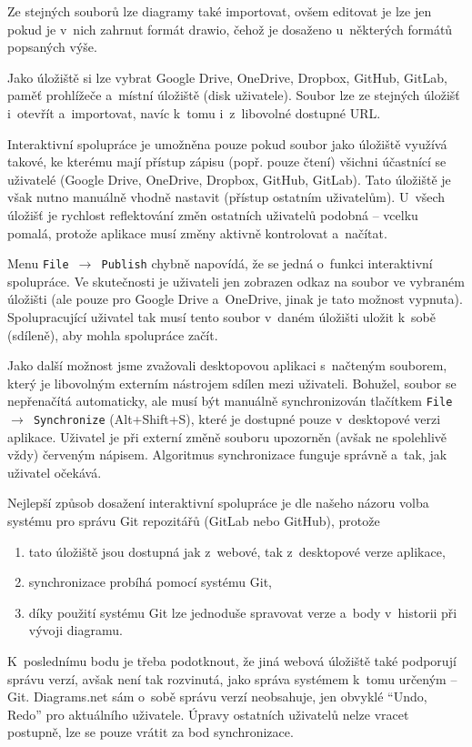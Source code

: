 Ze stejných souborů lze diagramy také importovat, ovšem editovat je lze jen
pokud je v~nich zahrnut formát drawio, čehož je dosaženo u~některých formátů
popsaných výše.

Jako úložiště si lze vybrat Google Drive, OneDrive, Dropbox, GitHub, GitLab,
paměť prohlížeče a~místní úložiště (disk uživatele). Soubor lze ze stejných
úložišť i~otevřít a~importovat, navíc k~tomu i~z~libovolné dostupné URL.

Interaktivní spolupráce je umožněna pouze pokud soubor jako úložiště využívá
takové, ke kterému mají přístup zápisu (popř. pouze čtení) všichni účastnící se
uživatelé (Google Drive, OneDrive, Dropbox, GitHub, GitLab). Tato úložiště je
však nutno manuálně vhodně nastavit (přístup ostatním uživatelům). U~všech
úložišť je rychlost reflektování změn ostatních uživatelů podobná -- vcelku
pomalá, protože aplikace musí změny aktivně kontrolovat a~načítat.

Menu \texttt{File $\rightarrow$ Publish} chybně napovídá, že se jedná o~funkci interaktivní
spolupráce. Ve skutečnosti je uživateli jen zobrazen odkaz na soubor ve vybraném
úložišti (ale pouze pro Google Drive a~OneDrive, jinak je tato možnost vypnuta).
Spolupracující uživatel tak musí tento soubor v~daném úložišti uložit k~sobě
(sdíleně), aby mohla spolupráce začít. 

Jako další možnost jsme zvažovali desktopovou aplikaci s~načteným souborem,
který je libovolným externím nástrojem sdílen mezi uživateli. Bohužel, soubor se
nepřenačítá automaticky, ale musí být manuálně synchronizován tlačítkem \texttt{File
$\rightarrow$ Synchronize} (Alt+Shift+S), které je dostupné pouze v~desktopové
verzi aplikace. Uživatel je při externí změně souboru upozorněn (avšak ne
spolehlivě vždy) červeným nápisem. Algoritmus synchronizace funguje správně
a~tak, jak uživatel očekává.

Nejlepší způsob dosažení interaktivní spolupráce je dle našeho názoru volba
systému pro správu Git repozitářů (GitLab nebo GitHub), protože
\begin{enumerate}
  \item tato úložiště jsou dostupná jak z~webové, tak z~desktopové verze
  aplikace,
  \item synchronizace probíhá pomocí systému Git,
  \item díky použití systému Git lze jednoduše spravovat verze a~body v~historii
  při vývoji diagramu.
\end{enumerate} 

K~poslednímu bodu je třeba podotknout, že jiná webová úložiště také podporují
správu verzí, avšak není tak rozvinutá, jako správa systémem k~tomu určeným --
Git. Diagrams.net sám o~sobě správu verzí neobsahuje, jen obvyklé ``Undo, Redo''
pro aktuálního uživatele. Úpravy ostatních uživatelů nelze vracet postupně, lze
se pouze vrátit za bod synchronizace.

